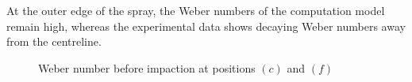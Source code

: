 \documentclass[a4paper,10pt]{article}
\begin{document}
At the outer edge of the spray, the Weber numbers of the computation model remain high, whereas the experimental data shows decaying Weber numbers away from the centreline.
\begin{figure}[H]
\centering
{}
\caption{Weber number before impaction at positions $(c)$ and $(f)$}
\label{fig:we_pre_cf}
\end{figure}
\end{document}
